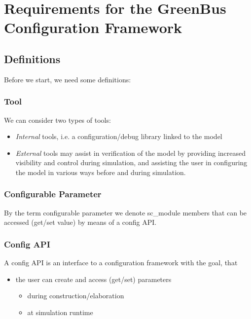 
\section{Requirements for the GreenBus Configuration Framework}
\label{requirements}

\subsection{Definitions}Before we start, we need some definitions: 


\subsubsection{Tool}
We can consider two types of tools: 

\begin{itemize}
	\item {\em Internal} tools, i.e. a configuration/debug library linked to the model  
	\item {\em External} tools may assist in verification of the model by providing increased visibility and control during simulation, and assisting the user in configuring the model in various ways before and during simulation. 
\end{itemize}


\subsubsection{Configurable Parameter}
By the term configurable parameter we denote sc\_module members that can be accessed (get/set value) by means of a config API.  


\subsubsection{Config API}A config API is an interface to a configuration framework with the goal, that  

\begin{itemize}
	\item the user can create and access (get/set) parameters 
	\begin{itemize}
		\item during construction/elaboration 
		\item at simulation runtime 
	\end{itemize}
\end{itemize}

